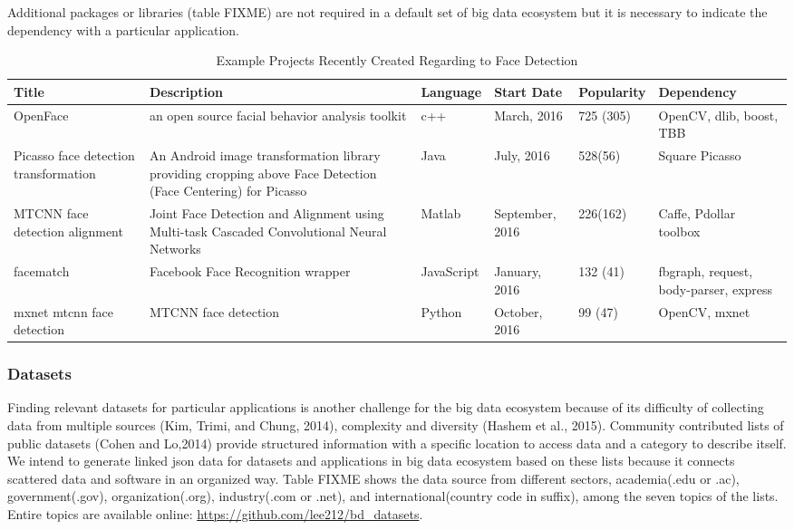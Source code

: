 \documentclass[9pt,twocolumn,twoside]{styles/osajnl}
\begin{document}
Additional packages or libraries (table FIXME) are not required in
a default set of big data ecosystem but it is necessary to indicate the
dependency with a particular application. 

\begin{table}[htb]
  \begin{center}
    \begin{small}
      \begin{tabular}{p{2cm}|p{5cm}|l|l|l|p{3cm}}

    Title & Description & Language & Start Date & Popularity & Dependency \\ \hline  \hline
    OpenFace &  an open source facial behavior analysis toolkit & c++ & March, 2016 & 725 (305) & OpenCV, dlib, boost, TBB \\ \hline
    Picasso face detection transformation & An Android image transformation library providing cropping above Face Detection (Face Centering) for Picasso & Java & July, 2016 & 528(56) & Square Picasso \\ \hline
    MTCNN face detection alignment & Joint Face Detection and Alignment using Multi-task Cascaded Convolutional Neural Networks & Matlab & September, 2016 & 226(162)  &  Caffe, Pdollar toolbox \\ \hline
    facematch & Facebook Face Recognition wrapper & JavaScript & January, 2016 & 132 (41) & fbgraph, request, body-parser, express \\ \hline
    mxnet mtcnn face detection & MTCNN face detection & Python  & October, 2016 & 99 (47) & OpenCV, mxnet \\ 


  \end{tabular}
  \caption{Example Projects Recently Created Regarding to Face Detection}
  \label{tab:project-examples-face}
\end{small}
  \end{center}
\end{table}


\subsubsection{Datasets}

Finding relevant datasets for particular applications is another
challenge for the big data ecosystem because of its difficulty of
collecting data from multiple sources (Kim, Trimi, and Chung, 2014),
complexity and diversity (Hashem et al., 2015). Community contributed
lists of public datasets (Cohen and Lo,2014) provide structured
information with a specific location to access data and a category to
describe itself. We intend to generate linked json data for datasets
and applications in big data ecosystem based on these lists because it
connects scattered data and software in an organized way. Table FIXME
shows the data source from different sectors, academia(.edu or .ac),
government(.gov), organization(.org), industry(.com or .net), and
international(country code in suffix), among the seven topics of the
lists. Entire topics are available online:
\url{https://github.com/lee212/bd_datasets}.
\end{document}
